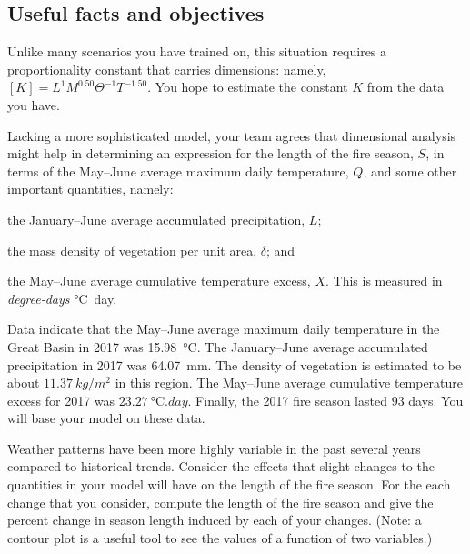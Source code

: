\documentclass[11pt]{article}\usepackage[]{graphicx}\usepackage[]{color}
\begin{document}
\subsection*{Useful facts and objectives}

    \begin{compactitem}

        \item Unlike many scenarios you have trained on, this situation
        requires a proportionality constant that carries dimensions: namely,
        $[K] = L^{1} M^{0.50} \Theta^{-1} T^{-1.50}$.
        You hope to estimate the constant $K$ from the data you have.

        \item Lacking a more sophisticated model, your team agrees that
        dimensional analysis might help in determining an expression for the
        length of the fire season, $S$, in terms of the May--June average
        maximum daily temperature, $Q$, and some other important quantities,
        namely:
        \begin{compactenum}
            \item the January--June average accumulated precipitation, $L$;
            \item the mass density of vegetation per unit area, $\delta$; and
            \item the May--June average cumulative temperature excess, $X$. This
            is measured in \emph{degree-days} \si{\celsius.day}.
        \end{compactenum}

        \item Data indicate that the May--June average maximum daily temperature in
        the Great Basin in 2017 was
        \SI{15.98}{\celsius}. The January--June average
        accumulated precipitation in 2017 was
        \SI{64.07}{mm}. The density of vegetation is
        estimated to be about $\SI{11.37}{kg/m^2}$ in this region.
        The May--June average cumulative temperature excess for 2017 was
        $\SI{23.27}{\celsius.day}$. Finally, the 2017 fire season
        lasted $\num{93}$ days. You will base your model on these
        data.

        \item Weather patterns have been more highly variable in the past several years
        compared to historical trends. Consider the effects that slight changes to the
        quantities in your model will have on the length of the fire season. For the
        each change that you consider, compute the length of the fire season and give the
        percent change in season length induced by each of your changes. (Note: a contour
        plot is a useful tool to see the values of a function of two variables.)

    \end{compactitem}
\end{document}
